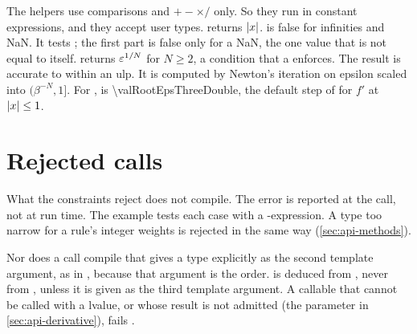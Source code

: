 The helpers use comparisons and $+ - \times /$ only. So they run in constant expressions, and they accept user types.
 returns $\lvert x \rvert$.  is false for infinities and NaN. It tests
; the first part is false only for a NaN, the one value that is not equal to itself.
 returns $\varepsilon^{1/N}$ for $N \ge 2$, a condition that a 
enforces. The result is accurate to within an ulp. It is computed by Newton's iteration on epsilon scaled into
$(\beta^{-N}, 1]$. For ,  is \num{\valRootEpsThreeDouble}, the default
step of  for $f'$ at $\lvert x \rvert \le 1$.

\section{Rejected calls}\label{sec:api-rejected}

What the constraints reject does not compile. The error is reported at the call, not at run time. The example tests
each case with a -expression. A type too narrow for a rule's integer weights is rejected in the same
way (\cref{sec:api-methods}).

Nor does a call compile that gives a type explicitly as the second template argument, as in
, because that argument is the order.  is deduced from ,
never from , unless it is given as the third template argument. A callable that cannot be called with a
 lvalue, or whose result is not admitted (the parameter  in \cref{sec:api-derivative}), fails
.
